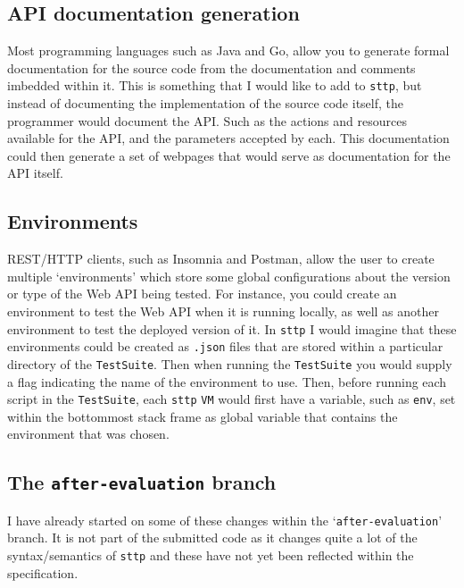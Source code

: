 \cprotect\subsection{API documentation generation}

Most programming languages such as Java and Go, allow you to generate formal documentation for the source code from the documentation and comments imbedded within it. This is something that I would like to add to \verb|sttp|, but instead of documenting the implementation of the source code itself, the programmer would document the API. Such as the actions and resources available for the API, and the parameters accepted by each. This documentation could then generate a set of webpages that would serve as documentation for the API itself.

\cprotect\subsection{Environments}

REST/HTTP clients, such as Insomnia and Postman, allow the user to create multiple `environments' which store some global configurations about the version or type of the Web API being tested. For instance, you could create an environment to test the Web API when it is running locally, as well as another environment to test the deployed version of it. In \verb|sttp| I would imagine that these environments could be created as \verb|.json| files that are stored within a particular directory of the \verb|TestSuite|. Then when running the \verb|TestSuite| you would supply a flag indicating the name of the environment to use. Then, before running each script in the \verb|TestSuite|, each \verb|sttp| \verb|VM| would first have a variable, such as \verb|env|, set within the bottommost stack frame as global variable that contains the environment that was chosen.

\cprotect\subsection{The \verb|after-evaluation| branch}

I have already started on some of these changes within the `\verb|after-evaluation|' branch. It is not part of the submitted code as it changes quite a lot of the syntax/semantics of \verb|sttp| and these have not yet been reflected within the specification.
